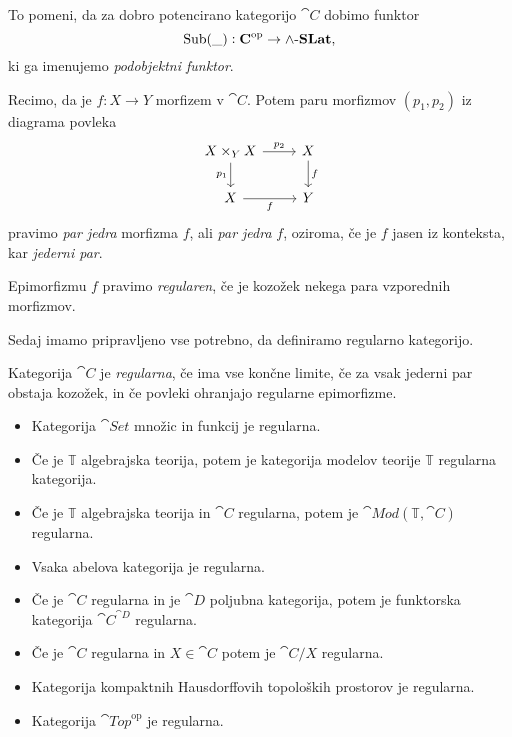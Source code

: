 \documentclass[../kategoricna_logika.tex]{subfiles}
\begin{document}
To pomeni, da za dobro potencirano kategorijo $\cat{C}$ dobimo funktor
$$\operatorname{Sub}(\_) : {\operatorname{\mathbf{C}}}^{\mathrm{op}} \to {\operatorname{\mathbf{\wedge-\mathbf{SLat}}}},$$
ki ga imenujemo \emph{podobjektni funktor}.
\begin{definicija}
    Recimo, da je $f : X \to Y$ morfizem v $\cat{C}$. Potem paru morfizmov $(p_1, p_2)$ iz diagrama povleka
    \begin{equation*}
        \begin{tikzcd}
        X \times_Y X \ar[d, "p_1"'] \ar[r, "p_2"] & X \ar[d, "f"] \\
        X \ar[r, "f"'] & Y
        \end{tikzcd}
    \end{equation*}
    pravimo \emph{par jedra} morfizma $f$, ali \emph{par jedra} $f$, oziroma,
    če je $f$ jasen iz konteksta, kar \emph{jederni par}.
\end{definicija}
\begin{definicija}
  Epimorfizmu $f$ pravimo \emph{regularen}, če je kozožek nekega para vzporednih morfizmov.
\end{definicija}
Sedaj imamo pripravljeno vse potrebno, da definiramo regularno kategorijo.
\begin{definicija}
    Kategorija $\cat{C}$ je \emph{regularna}, če ima vse končne limite,
    če za vsak jederni par obstaja kozožek, in če povleki ohranjajo regularne epimorfizme.
\end{definicija}
\begin{primer}
\begin{itemize}
  \item Kategorija $\cat{Set}$ množic in funkcij je regularna.
  \item Če je $\mathbb{T}$ algebrajska teorija, potem je kategorija modelov teorije $\mathbb{T}$ regularna kategorija.
  \item Če je $\mathbb{T}$ algebrajska teorija in $\cat{C}$ regularna,
    potem je $\cat{Mod}(\mathbb{T}, \cat{C})$ regularna.
  \item Vsaka abelova kategorija je regularna.
  \item Če je $\cat{C}$ regularna in je $\cat{D}$ poljubna kategorija,
    potem je funktorska kategorija $\cat{C}^{\cat{D}}$ regularna.
  \item Če je $\cat{C}$ regularna in $X \in \cat{C}$ potem je $\cat{C}/X$ regularna.
  \item Kategorija kompaktnih Hausdorffovih topoloških prostorov je regularna.
  \item Kategorija $\cat{Top}^{\mathrm{op}}$ je regularna.
\end{itemize}
\end{primer}
\end{document}
